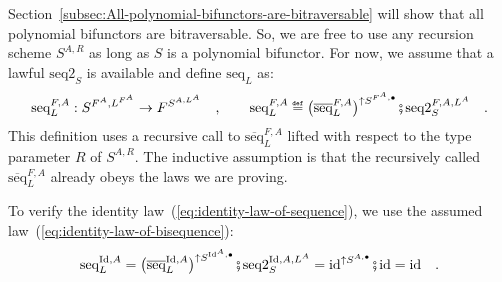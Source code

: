 Section~\ref{subsec:All-polynomial-bifunctors-are-bitraversable}
will show that all polynomial bifunctors are bitraversable. So, we
are free to use any recursion scheme $S^{A,R}$ as long as $S$ is
a polynomial bifunctor. For now, we assume that a lawful $\text{seq2}_{S}$
is available and define $\text{seq}_{L}$ as:
\[
\text{seq}_{L}^{F,A}:S^{F^{A},L^{F^{A}}}\rightarrow F^{S^{A,L^{A}}}\quad,\quad\quad\text{seq}_{L}^{F,A}\triangleq\big(\overline{\text{seq}}_{L}^{F,A}\big)^{\uparrow S^{F^{A},\bullet}}\bef\text{seq2}_{S}^{F,A,L^{A}}\quad.
\]
This definition uses a recursive call to $\overline{\text{seq}}_{L}^{F,A}$
lifted with respect to the type parameter $R$ of $S^{A,R}$. The
inductive assumption is that the recursively called $\overline{\text{seq}}_{L}^{F,A}$
already obeys the laws we are proving.

To verify the identity law~(\ref{eq:identity-law-of-sequence}),
we use the assumed law~(\ref{eq:identity-law-of-bisequence}):
\[
\text{seq}_{L}^{\text{Id},A}=\big(\overline{\text{seq}}_{L}^{\text{Id},A}\big)^{\uparrow S^{\text{Id}^{A},\bullet}}\bef\text{seq2}_{S}^{\text{Id},A,L^{A}}=\text{id}^{\uparrow S^{A,\bullet}}\bef\text{id}=\text{id}\quad.
\]

